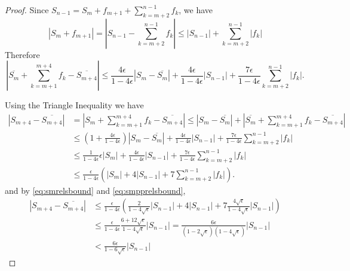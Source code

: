 \documentclass[12pt]{article}
\providecommand{\fl}{\ensuremath{\text{fl}}}
\theoremstyle{definition}
\numberwithin{equation}{section}
\numberwithin{figure}{section}
\begin{document}
\begin{proof}
    Since $S_{n-1} = S_m + f_{m+1} + \sum_{k=m+2}^{n-1} f_k$, we have
    \[
        |S_m + f_{m+1}|
        = |S_{n-1} - \sum_{k=m+2}^{n-1}f_k|
        \leq |S_{n-1}| + \sum_{k=m+2}^{n-1} |f_k| 
    \]
    Therefore
    \[
        |\overline{S_m} + \sum_{k=m+1}^{m+4}f_k - \overline{S_{m+4}}|
        \leq \frac{4\epsilon}{1-4\epsilon} |S_m - \overline{S_m}|
        + \frac{4\epsilon}{1-4\epsilon} |S_{n-1}|
        + \frac{7\epsilon}{1-4\epsilon} \sum_{k=m+2}^{n-1}|f_k|. 
    \]

    Using the Triangle Inequality we have
    \begin{align*}
    |S_{m+4} - \overline{S_{m+4}}| 
        & = |S_m + \sum_{k=m+1}^{m+4}f_k - \overline{S_{m+4}}| 
        \leq |S_m - \overline{S_m} | + |\overline{S_m} + \sum_{k=m+1}^{m+4}f_k - \overline{S_{m+4}} | \\
        & \leq (1 + \frac{4\epsilon}{1-4\epsilon}) |S_m - \overline{S_m}| + \frac{4\epsilon}{1-4\epsilon} |S_{n-1}|
                + \frac{7\epsilon}{1-4\epsilon} \sum_{k=m+2}^{n-1}|f_k| \\
        & \leq \frac{1}{1-4\epsilon} \epsilon |S_m| + \frac{4\epsilon}{1-4\epsilon} |S_{n-1}|
                + \frac{7\epsilon}{1-4\epsilon} \sum_{k=m+2}^{n-1}|f_k| \\
        & \leq \frac{\epsilon}{1-4\epsilon} \left(|S_m| + 4 |S_{n-1}|
                + 7 \sum_{k=m+2}^{n-1}|f_k|\right). 
    \end{align*}
    and by \eqref{eq:smrelsbound} and \eqref{eq:smpprelsbound},
    \begin{align}
    |S_{m+4} - \overline{S_{m+4}}| 
        & \leq \frac{\epsilon}{1-4\epsilon} 
            \left(
                \frac{2}{1-4\sqrt{\epsilon}} |S_{n-1}|
                + 4 |S_{n-1}|
                + 7 \frac{4\sqrt{\epsilon}}{1-4\sqrt{\epsilon}} |S_{n-1}|
            \right) \nonumber \\
        & \leq \frac{\epsilon}{1-4\epsilon} \frac{6+12\sqrt{\epsilon}}{1-4\sqrt{\epsilon}} |S_{n-1}| 
            = \frac{6\epsilon }{(1-2\sqrt{\epsilon})(1-4\sqrt{\epsilon})} |S_{n-1}| \nonumber \\
        & < \frac{6\epsilon}{1-6\sqrt{\epsilon}} |S_{n-1}| 
        \label{eq:smfiveerror}
    \end{align}

\end{proof}
\end{document}
